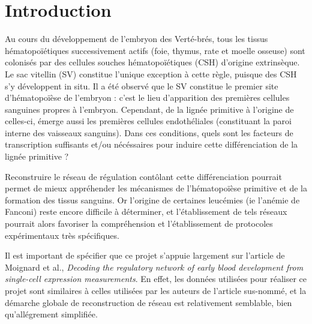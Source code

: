 \documentclass[fleqn,11pt]{SelfArx} %
\affiliation{\textsuperscript{1}\textit{Master 2 Bioinformatique et Modélisation, Université Paris 6, France}}
\affiliation{\textsuperscript{2}\textit{Institut Curie, France}}
\begin{document}
\flushbottom %
\maketitle


\tableofcontents 

\thispagestyle{empty} 


\section*{Introduction}
Au cours du développement de l'embryon des Verté-brés, tous les tissus hématopoïétiques successivement actifs (foie, thymus, rate et moelle osseuse) sont colonisés par des cellules souches hématopoïétiques (CSH) d'origine extrinsèque. Le sac vitellin (SV) constitue l'unique exception à cette règle, puisque des CSH s'y développent in situ. Il a été observé que le SV constitue le premier site d'hématopoïèse de l'embryon\cite{Cumano} : c'est le lieu d'apparition des premières cellules sanguines propres à l'embryon. Cependant, de la lignée primitive à l'origine de celles-ci, émerge aussi les premières cellules endothéliales (constituant la paroi interne des vaisseaux sanguins). Dans ces conditions, quels sont les facteurs de transcription suffisants et/ou nécéssaires pour induire cette différenciation de la lignée primitive ?

\par Reconstruire le réseau de régulation contôlant cette différenciation pourrait permet de mieux appréhender les mécanismes de l'hématopoïèse primitive et de la formation des tissus sanguins. Or l'origine de certaines leucémies (ie l'anémie de Fanconi\cite{Fanconi}) reste encore difficile à déterminer, et l'établissement de tels réseaux pourrait alors favoriser la compréhension et l'établissement de protocoles expérimentaux très spécifiques. 
 
\par Il est important de spécifier que ce projet s'appuie largement sur l'article de Moignard et al., \textit{Decoding the regulatory network of early blood development from single-cell expression measurements}\cite{Moignard}. En effet, les données utilisées pour réaliser ce projet sont similaires à celles utilisées par les auteurs de l'article sus-nommé, et la démarche globale de reconstruction de réseau est relativement semblable, bien qu'allégrement simplifiée. 
\end{document}
